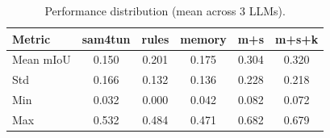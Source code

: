 \begin{table}[ht]
\caption{Performance distribution (mean across 3 LLMs).}\label{tab:distribution}
\begin{tabular*}{\tblwidth}{@{} l c c c c c @{}}
\toprule
Metric & sam4tun & rules & memory & m+s & m+s+k \\
\midrule
Mean mIoU & 0.150 & 0.201 & 0.175 & 0.304 & 0.320 \\
Std & 0.166 & 0.132 & 0.136 & 0.228 & 0.218 \\
Min & 0.032 & 0.000 & 0.042 & 0.082 & 0.072 \\
Max & 0.532 & 0.484 & 0.471 & 0.682 & 0.679 \\
\bottomrule
\end{tabular*}
\end{table}


\clearpage
\FloatBarrier

